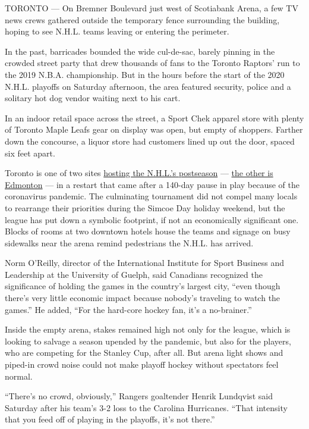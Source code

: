 TORONTO --- On Bremner Boulevard just west of Scotiabank Arena, a few TV
news crews gathered outside the temporary fence surrounding the
building, hoping to see N.H.L. teams leaving or entering the perimeter.

In the past, barricades bounded the wide cul-de-sac, barely pinning in
the crowded street party that drew thousands of fans to the Toronto
Raptors' run to the 2019 N.B.A. championship. But in the hours before
the start of the 2020 N.H.L. playoffs on Saturday afternoon, the area
featured security, police and a solitary hot dog vendor waiting next to
his cart.

In an indoor retail space across the street, a Sport Chek apparel store
with plenty of Toronto Maple Leafs gear on display was open, but empty
of shoppers. Farther down the concourse, a liquor store had customers
lined up out the door, spaced six feet apart.

Toronto is one of two sites
\href{https://www.nytimes3xbfgragh.onion/2020/07/06/sports/hockey/nhl-playoffs.html}{hosting
the N.H.L.'s postseason} ---
\href{https://www.nytimes3xbfgragh.onion/2020/08/01/sports/hockey/edmonton-nhl-playoffs.html}{the
other is Edmonton} --- in a restart that came after a 140-day pause in
play because of the coronavirus pandemic. The culminating tournament did
not compel many locals to rearrange their priorities during the Simcoe
Day holiday weekend, but the league has put down a symbolic footprint,
if not an economically significant one. Blocks of rooms at two downtown
hotels house the teams and signage on busy sidewalks near the arena
remind pedestrians the N.H.L. has arrived.

Norm O'Reilly, director of the International Institute for Sport
Business and Leadership at the University of Guelph, said Canadians
recognized the significance of holding the games in the country's
largest city, ``even though there's very little economic impact because
nobody's traveling to watch the games.'' He added, ``For the hard-core
hockey fan, it's a no-brainer.''

Inside the empty arena, stakes remained high not only for the league,
which is looking to salvage a season upended by the pandemic, but also
for the players, who are competing for the Stanley Cup, after all. But
arena light shows and piped-in crowd noise could not make playoff hockey
without spectators feel normal.

``There's no crowd, obviously,'' Rangers goaltender Henrik Lundqvist
said Saturday after his team's 3-2 loss to the Carolina Hurricanes.
``That intensity that you feed off of playing in the playoffs, it's not
there.''

